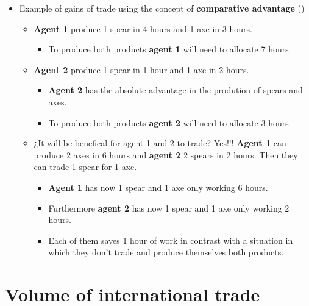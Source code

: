 \documentclass[
  ignorenonframetext,
]{beamer}
\providecommand{\tightlist}{%
  \setlength{\itemsep}{0pt}\setlength{\parskip}{0pt}}\usepackage{longtable,booktabs,array}
\begin{document}
\begin{frame}{}
\label{section-3}
\begin{itemize}
\item
  Example of gains of trade using the concept of \textbf{comparative
  advantage} ()

  \begin{itemize}
  \item
    \textbf{Agent 1} produce 1 spear in 4 hours and 1 axe in 3 hours.

    \begin{itemize}
    \tightlist
    \item
      To produce both products \textbf{agent 1} will need to allocate 7
      hours
    \end{itemize}
  \item
    \textbf{Agent 2} produce 1 spear in 1 hour and 1 axe in 2 hours.

    \begin{itemize}
    \tightlist
    \item
      \textbf{Agent 2} has the absolute advantage in the prodution of
      spears and axes.
    \item
      To produce both products \textbf{agent 2} will need to allocate 3
      hours
    \end{itemize}
  \item
    ¿It will be benefical for agent 1 and 2 to trade? Yes!!!
    \textbf{Agent 1} can produce 2 axes in 6 hours and \textbf{agent 2}
    2 spears in 2 hours. Then they can trade 1 spear for 1 axe.

    \begin{itemize}
    \tightlist
    \item
      \textbf{Agent 1} has now 1 spear and 1 axe only working 6 hours.
    \item
      Furthermore \textbf{agent 2} has now 1 spear and 1 axe only
      working 2 hours.
    \item
      Each of them saves 1 hour of work in contrast with a situation in
      which they don't trade and produce themselves both products.
    \end{itemize}
  \end{itemize}
\end{itemize}
\end{frame}

\section{Volume of international
trade}\label{volume-of-international-trade}
\end{document}
